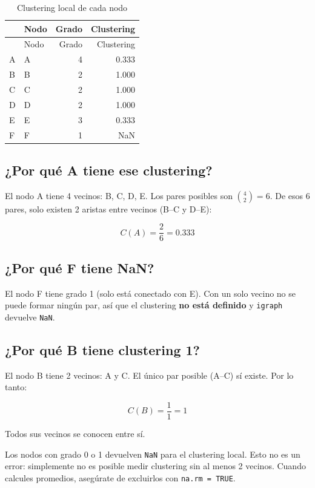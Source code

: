 \documentclass[
  letterpaper,
  DIV=11,
  numbers=noendperiod]{scrreprt}
\begin{document}
\begin{longtable}[]{@{}llrr@{}}
\caption{Clustering local de cada nodo}\tabularnewline
\toprule\noalign{}
& Nodo & Grado & Clustering \\
\midrule\noalign{}
\endfirsthead
\toprule\noalign{}
& Nodo & Grado & Clustering \\
\midrule\noalign{}
\endhead
\bottomrule\noalign{}
\endlastfoot
A & A & 4 & 0.333 \\
B & B & 2 & 1.000 \\
C & C & 2 & 1.000 \\
D & D & 2 & 1.000 \\
E & E & 3 & 0.333 \\
F & F & 1 & NaN \\
\end{longtable}

\subsection{¿Por qué A tiene ese clustering?}

El nodo A tiene 4 vecinos: B, C, D, E. Los pares posibles son
\(\binom{4}{2} = 6\). De esos 6 pares, solo existen 2 aristas entre
vecinos (B--C y D--E):

\[C(A) = \frac{2}{6} = 0.333\]

\subsection{¿Por qué F tiene NaN?}

El nodo F tiene grado 1 (solo está conectado con E). Con un solo vecino
no se puede formar ningún par, así que el clustering \textbf{no está
definido} y \texttt{igraph} devuelve \texttt{NaN}.

\subsection{¿Por qué B tiene clustering 1?}

El nodo B tiene 2 vecinos: A y C. El único par posible (A--C) sí existe.
Por lo tanto:

\[C(B) = \frac{1}{1} = 1\]

Todos sus vecinos se conocen entre sí.

\begin{tcolorbox}[enhanced jigsaw, toprule=.15mm, colframe=quarto-callout-warning-color-frame, coltitle=black, titlerule=0mm, colback=white, breakable, leftrule=.75mm, arc=.35mm, bottomtitle=1mm, toptitle=1mm, rightrule=.15mm, bottomrule=.15mm, left=2mm, title=\textcolor{quarto-callout-warning-color}{\faExclamationTriangle}\hspace{0.5em}{⚠️ Error frecuente}, colbacktitle=quarto-callout-warning-color!10!white, opacityback=0, opacitybacktitle=0.6]

Los nodos con grado 0 o 1 devuelven \texttt{NaN} para el clustering
local. Esto no es un error: simplemente no es posible medir clustering
sin al menos 2 vecinos. Cuando calcules promedios, asegúrate de
excluirlos con \texttt{na.rm\ =\ TRUE}.

\end{tcolorbox}
\end{document}
